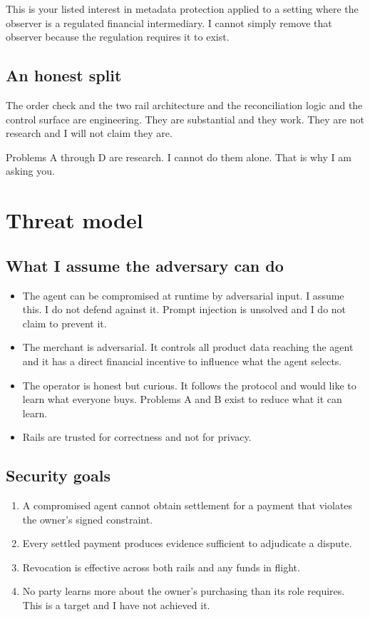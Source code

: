 \documentclass[journal,onecolumn,11pt]{IEEEtran}
\begin{document}
This is your listed interest in metadata protection applied to a setting where the
observer is a regulated financial intermediary. I cannot simply remove that observer
because the regulation requires it to exist.

\subsection{An honest split}
The order check and the two rail architecture and the reconciliation logic and the control
surface are engineering. They are substantial and they work. They are not research and I
will not claim they are.

Problems A through D are research. I cannot do them alone. That is why I am asking you.

\section{Threat model}

\subsection{What I assume the adversary can do}
\begin{itemize}[leftmargin=*]
\item The agent can be compromised at runtime by adversarial input. I assume this. I do
not defend against it. Prompt injection is unsolved and I do not claim to prevent it.
\item The merchant is adversarial. It controls all product data reaching the agent and it
has a direct financial incentive to influence what the agent selects.
\item The operator is honest but curious. It follows the protocol and would like to learn
what everyone buys. Problems A and B exist to reduce what it can learn.
\item Rails are trusted for correctness and not for privacy.
\end{itemize}

\subsection{Security goals}
\begin{enumerate}[leftmargin=*]
\item A compromised agent cannot obtain settlement for a payment that violates the
owner's signed constraint.
\item Every settled payment produces evidence sufficient to adjudicate a dispute.
\item Revocation is effective across both rails and any funds in flight.
\item No party learns more about the owner's purchasing than its role requires. This is a
target and I have not achieved it.
\end{enumerate}
\end{document}
